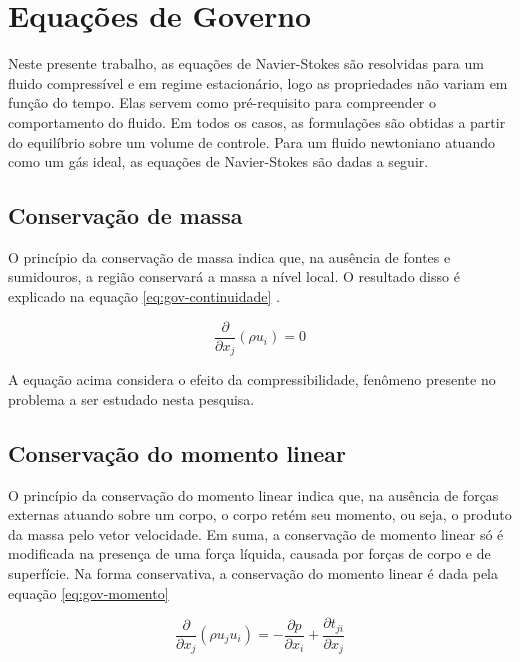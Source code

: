 \section{Equações de Governo}

Neste presente trabalho, as equações de Navier-Stokes são resolvidas para um fluido compressível e em regime estacionário, logo as propriedades não variam em função do tempo. Elas servem como pré-requisito para compreender o comportamento do fluido. Em todos os casos, as formulações são obtidas a partir do equilíbrio sobre um volume de controle. Para um fluido newtoniano atuando como um gás ideal, as equações de Navier-Stokes são dadas a seguir.

\subsection{Conservação de massa}

O princípio da conservação de massa indica que, na ausência de fontes e sumidouros, a região conservará a massa a nível local. O resultado disso é explicado na equação \ref{eq:gov-continuidade} \cite{Moukalled2015, Wilcox2006}.

\begin{equation}
    \label{eq:gov-continuidade}
    \frac{\partial}{\partial x_j}(\rho u_i) = 0
\end{equation}

A equação acima considera o efeito da compressibilidade, fenômeno presente no problema a ser estudado nesta pesquisa.

\subsection{Conservação do momento linear}

O princípio da conservação do momento linear indica que, na ausência de forças externas atuando sobre um corpo, o corpo retém seu momento, ou seja, o produto da massa pelo vetor velocidade. Em suma, a conservação de momento linear só é modificada na presença de uma força líquida, causada por forças de corpo e de superfície. Na forma conservativa, a conservação do momento linear é dada pela equação \ref{eq:gov-momento} \cite{Moukalled2015, Wilcox2006}

\begin{equation}
    \label{eq:gov-momento}
    \frac{\partial}{\partial x_j}(\rho u_j u_i) = -\frac{\partial p}{\partial x_i} + \frac{\partial t_{ji}}{\partial x_j}
\end{equation}

